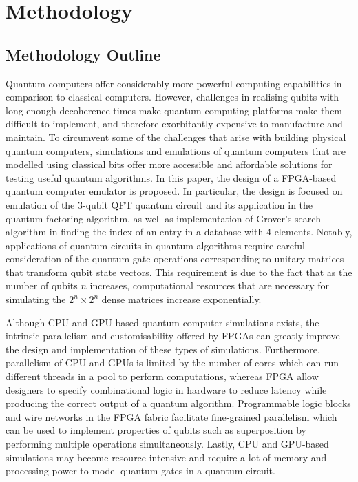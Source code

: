 \chapter{\label{ch:methodology} Methodology}

\section{Methodology Outline \label{sec:method-outline}}

Quantum computers offer considerably more powerful computing capabilities in comparison to classical computers. However, challenges in realising qubits with long enough decoherence times make quantum computing platforms make them difficult to implement, and therefore exorbitantly expensive to manufacture and maintain. To circumvent some of the challenges that arise with building physical quantum computers, simulations and emulations of quantum computers that are modelled using classical bits offer more accessible and affordable solutions for testing useful quantum algorithms. In this paper, the design of a FPGA-based quantum computer emulator is proposed. In particular, the design is focused on emulation of the 3-qubit QFT quantum circuit and its application in the quantum factoring algorithm, as well as implementation of Grover's search algorithm in finding the index of an entry in a database with 4 elements. Notably, applications of quantum circuits in quantum algorithms require careful consideration of the quantum gate operations corresponding to unitary matrices that transform qubit state vectors. This requirement is due to the fact that as the number of qubits $n$ increases, computational resources that are necessary for simulating the $2^n \times 2^n$ dense matrices increase exponentially. 

Although CPU and GPU-based quantum computer simulations exists, the intrinsic parallelism and customisability offered by FPGAs can greatly improve the design and implementation of these types of simulations. Furthermore, parallelism of CPU and GPUs is limited by the number of cores which can run different threads in a pool to perform computations, whereas FPGA allow designers to specify combinational logic in hardware to reduce latency while producing the correct output of a quantum algorithm. Programmable logic blocks and wire networks in the FPGA fabric facilitate fine-grained parallelism which can be used to implement properties of qubits such as superposition by performing multiple operations simultaneously. Lastly, CPU and GPU-based simulations may become resource intensive and require a lot of memory and processing power to model quantum gates in a quantum circuit. 

